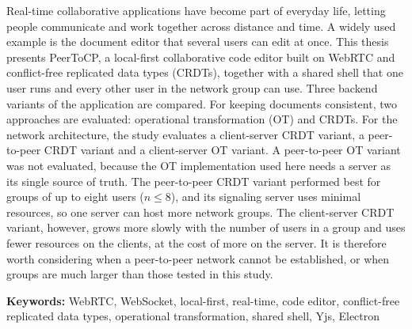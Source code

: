 Real-time collaborative applications have become part of everyday life, letting people communicate and work together across distance and time. A widely used example is the document editor that several users can edit at once. This thesis presents PeerToCP, a local-first collaborative code editor built on WebRTC and conflict-free replicated data types (CRDTs), together with a shared shell that one user runs and every other user in the network group can use. Three backend variants of the application are compared. For keeping documents consistent, two approaches are evaluated: operational transformation (OT) and CRDTs. For the network architecture, the study evaluates a client-server CRDT variant, a peer-to-peer CRDT variant and a client-server OT variant. A peer-to-peer OT variant was not evaluated, because the OT implementation used here needs a server as its single source of truth. The peer-to-peer CRDT variant performed best for groups of up to eight users ($n \leq 8$), and its signaling server uses minimal resources, so one server can host more network groups. The client-server CRDT variant, however, grows more slowly with the number of users in a group and uses fewer resources on the clients, at the cost of more on the server. It is therefore worth considering when a peer-to-peer network cannot be established, or when groups are much larger than those tested in this study.

\vspace{1em}
\noindent\textbf{Keywords:} WebRTC, WebSocket, local-first, real-time, code editor, conflict-free replicated data types, operational transformation, shared shell, Yjs, Electron
